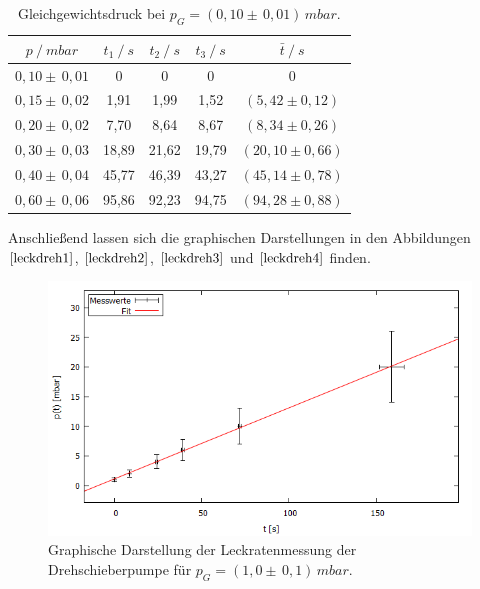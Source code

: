 \begin{table}[H]
\centering
\begin{tabular}{c|c|c|c|c}
	{$p \:/\: \si{mbar}$} & {$t_1 \:/\: \si{s} $} & {$t_2 \:/\: \si{s} $} & {$t_3 \:/\: \si{s} $} & {$\bar{t} \:/\: \si{s}$}\\
\midrule
$0,10 \pm \, 0,01$ &0 &0 &0 &0\\
$0,15 \pm \, 0,02$ &   1,91 &  1,99 &  1,52 & $(5,42 \pm 0,12)$\\
$0,20 \pm \, 0,02$ &   7,70  &  8,64 &  8,67 & $(8,34 \pm 0,26) $\\
$0,30 \pm \, 0,03$ &   18,89 &  21,62 &  19,79 & $(20,10 \pm 0,66) $\\
$0,40 \pm \, 0,04$ &   45,77 &  46,39 & 43,27 & $(45,14 \pm 0,78) $\\
$0,60 \pm \, 0,06$ &   95,86 &  92,23 &  94,75 & $(94,28 \pm 0,88) $\\
\end{tabular}
\caption{Gleichgewichtsdruck bei $p_G=(0,10 \pm \, 0,01) \, \si{mbar}$.}
\label{tab:leck_Dreh4}
\end{table}
Anschließend lassen sich die graphischen Darstellungen in den Abbildungen $\ref{leckdreh1}$, $\ref{leckdreh2}$, $\ref{leckdreh3}$ und $\ref{leckdreh4}$ finden.
\begin{figure}[H]
  \centering
  \includegraphics[width=14cm]{bilder/leckdrehfit1.png}
	\caption{Graphische Darstellung der Leckratenmessung der Drehschieberpumpe für $p_G=(1,0 \pm \, 0,1)  \, \si{mbar}$.}
  \label{leckdreh1}
\end{figure}
